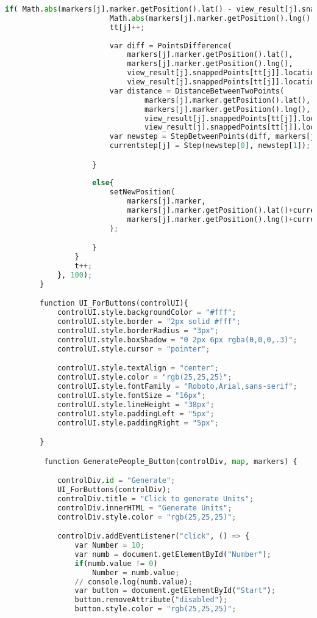 \documentclass[a4paper]{article}
\begin{document}
\begin{lstlisting}[language=python,tabsize = 1,breaklines=true, breakatwhitespace=false,frame=single]
					if( Math.abs(markers[j].marker.getPosition().lat() - view_result[j].snappedPoints[tt[j]].location.latitude) <= 0.00001 &&
						Math.abs(markers[j].marker.getPosition().lng() - view_result[j].snappedPoints[tt[j]].location.longitude) <= 0.00001){
						tt[j]++;
						
						var diff = PointsDifference(
							markers[j].marker.getPosition().lat(),
							markers[j].marker.getPosition().lng(),
							view_result[j].snappedPoints[tt[j]].location.latitude,
							view_result[j].snappedPoints[tt[j]].location.longitude);
						var distance = DistanceBetweenTwoPoints(
								markers[j].marker.getPosition().lat(),
								markers[j].marker.getPosition().lng(),
								view_result[j].snappedPoints[tt[j]].location.latitude,
								view_result[j].snappedPoints[tt[j]].location.longitude);
						var newstep = StepBetweenPoints(diff, markers[j].speed, distance);
						currentstep[j] = Step(newstep[0], newstep[1]);

					}
					
					else{
						setNewPosition(
							markers[j].marker, 
							markers[j].marker.getPosition().lat()+currentstep[j].step_lat, 
							markers[j].marker.getPosition().lng()+currentstep[j].step_lng
						);

					}
				}
				t++;
			}, 100);
		}

		function UI_ForButtons(controlUI){
			controlUI.style.backgroundColor = "#fff";
			controlUI.style.border = "2px solid #fff";
			controlUI.style.borderRadius = "3px";
			controlUI.style.boxShadow = "0 2px 6px rgba(0,0,0,.3)";
			controlUI.style.cursor = "pointer";

			controlUI.style.textAlign = "center";
			controlUI.style.color = "rgb(25,25,25)";
			controlUI.style.fontFamily = "Roboto,Arial,sans-serif";
			controlUI.style.fontSize = "16px";
			controlUI.style.lineHeight = "38px";
			controlUI.style.paddingLeft = "5px";
			controlUI.style.paddingRight = "5px";

		}

		 function GeneratePeople_Button(controlDiv, map, markers) {

			controlDiv.id = "Generate";
			UI_ForButtons(controlDiv);
			controlDiv.title = "Click to generate Units";
			controlDiv.innerHTML = "Generate Units";
			controlDiv.style.color = "rgb(25,25,25)";

			controlDiv.addEventListener("click", () => {
				var Number = 10;
				var numb = document.getElementById("Number");
				if(numb.value != 0)
					Number = numb.value;
				// console.log(numb.value);
				var button = document.getElementById("Start");
				button.removeAttribute("disabled");
				button.style.color = "rgb(25,25,25)";


\end{lstlisting}
\end{document}

